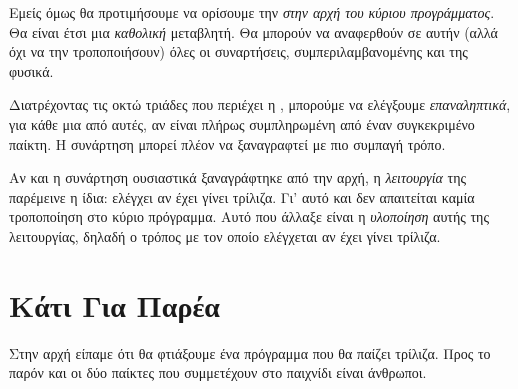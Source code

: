 \documentclass[a4paper,11pt,oneside]{book}
\begin{document}
Εμείς όμως θα προτιμήσουμε να ορίσουμε την  \emph{στην αρχή του κύριου προγράμματος}. Θα είναι έτσι μια \emph{καθολική} μεταβλητή. Θα μπορούν να αναφερθούν σε αυτήν (αλλά όχι να την  τροποποιήσουν) όλες οι συναρτήσεις, συμπεριλαμβανομένης και της  φυσικά.


Διατρέχοντας τις οκτώ τριάδες που περιέχει η , μπορούμε να ελέγξουμε \emph{επαναληπτικά}, για κάθε μια από αυτές, αν είναι πλήρως συμπληρωμένη από έναν συγκεκριμένο παίκτη. Η συνάρτηση  μπορεί πλέον να ξαναγραφτεί με πιο συμπαγή τρόπο.


Αν και η συνάρτηση  ουσιαστικά ξαναγράφτηκε από την αρχή, η \emph{λειτουργία} της παρέμεινε η ίδια: ελέγχει αν έχει γίνει τρίλιζα. Γι' αυτό και δεν απαιτείται καμία τροποποίηση στο κύριο πρόγραμμα. Αυτό που άλλαξε είναι η \emph{υλοποίηση} αυτής της λειτουργίας, δηλαδή ο τρόπος με τον οποίο ελέγχεται αν έχει γίνει τρίλιζα. 

\section{Κάτι Για Παρέα}

\begin{question}
Στην αρχή είπαμε ότι θα φτιάξουμε ένα πρόγραμμα που θα παίζει τρίλιζα. Προς το παρόν και οι δύο παίκτες που συμμετέχουν στο παιχνίδι είναι άνθρωποι.
\end{question}
\end{document}
